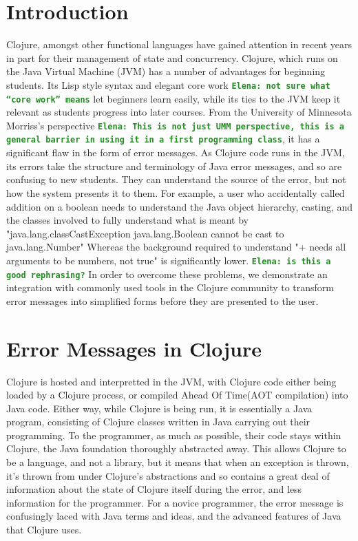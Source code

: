 \documentclass[12pt]{article}
\newcommand{\comment}[1]{{\bf \tt  {#1}}}
\newcommand{\emcomment}[1]{\textcolor{ForestGreen}{\comment{Elena: {#1}}}}
\begin{document}
\section{Introduction}
Clojure, amongst other functional languages have gained attention in recent years
in part for their management of state and concurrency.
Clojure, which runs on the Java Virtual Machine (JVM) has a number of advantages for beginning students.
Its Lisp style syntax and elegant core work \emcomment{not sure what ``core work'' means}
 let beginners learn easily, while
its ties to the JVM keep it relevant as students progress into later courses.
From the University of Minnesota Morriss's perspective
\emcomment{This is not just UMM perspective, this is a general barrier in using it in a first programming class}, it has a significant flaw in the form of error messages.
As Clojure code runs in the JVM, its errors take the structure and terminology of Java error messages,
and so are confusing to new students. They can understand the source of the error,
but not how the system presents it to them.
For example, a user who accidentally called addition on a boolean needs
 to understand the Java object hierarchy, casting,
 and the classes involved to fully understand what is meant by
 "java.lang.classCastException java.lang.Boolean cannot be cast to java.lang.Number"
Whereas the background required to understand "+ needs all arguments to be numbers, not true"
 is significantly lower. \emcomment{is this a good rephrasing?}
 In order to overcome these problems,
  we demonstrate an integration with commonly used tools in the Clojure community
 to transform error messages into simplified forms before they are presented to the user.

\cite{Hickey:2008}

\section{Error Messages in Clojure}
Clojure is hosted and interpretted in the JVM, with Clojure code either being
loaded by a Clojure process, or compiled Ahead Of Time(AOT compilation) into Java code.
Either way, while Clojure is being run, it is essentially a Java program, consisting of
Clojure classes written in Java carrying out their programming.
To the programmer, as much as possible, their code stays within Clojure,
the Java foundation thoroughly abstracted away.
This allows Clojure to be a language, and not a library, but it means
 that when an exception is thrown, it's thrown from under Clojure's abstractions
 and so contains a great deal of information about the state of Clojure itself
 during the error, and less information for the programmer.
 For a novice programmer, the error message is confusingly laced
  with Java terms and ideas, and the advanced features of Java that Clojure uses.
\end{document}
